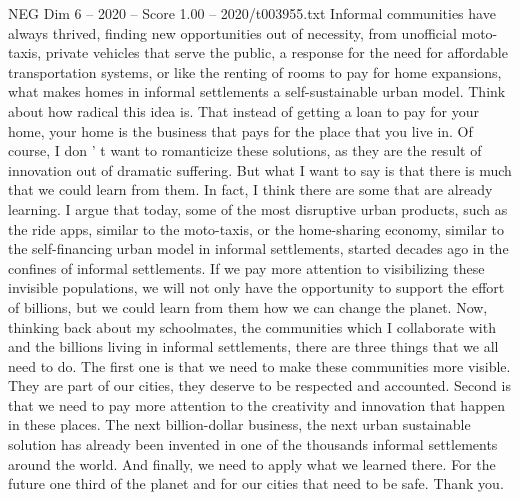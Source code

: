 \begin{textsample}{NEG Dim 6 – 2020 – Score 1.00 – 2020/t003955.txt}
Informal communities have always thrived, finding new opportunities out of necessity, from unofficial moto-taxis, private vehicles that serve the public, a response for the need for affordable transportation systems, or like the renting of rooms to pay for home expansions, what makes homes in informal settlements a self-sustainable urban model.
Think about how radical this idea is.
That instead of getting a loan to pay for your home, your home is the business that pays for the place that you live in.
Of course, I don ' t want to romanticize these solutions, as they are the result of innovation out of dramatic suffering.
But what I want to say is that there is much that we could learn from them.
In fact, I think there are some that are already learning.
I argue that today, some of the most disruptive urban products, such as the ride apps, similar to the moto-taxis, or the home-sharing economy, similar to the self-financing urban model in informal settlements, started decades ago in the confines of informal settlements.
If we pay more attention to visibilizing these invisible populations, we will not only have the opportunity to support the effort of billions, but we could learn from them how we can change the planet.
Now, thinking back about my schoolmates, the communities which I collaborate with and the billions living in informal settlements, there are three things that we all need to do.
The first one is that we need to make these communities more visible.
They are part of our cities, they deserve to be respected and accounted.
Second is that we need to pay more attention to the creativity and innovation that happen in these places.
The next billion-dollar business, the next urban sustainable solution has already been invented in one of the thousands informal settlements around the world.
And finally, we need to apply what we learned there.
For the future one third of the planet and for our cities that need to be safe.
Thank you.

\end{textsample}
